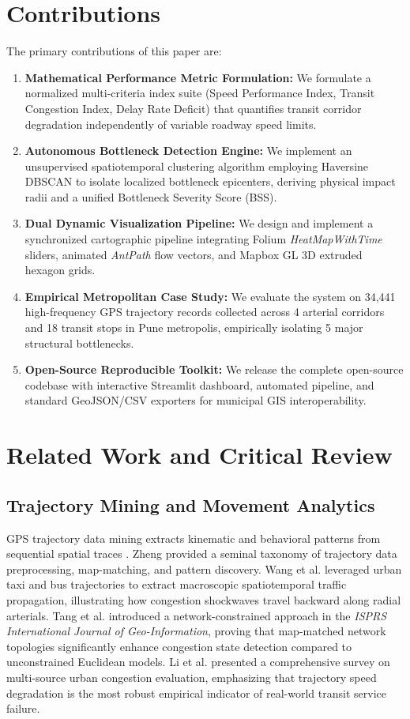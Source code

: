 \documentclass[conference]{IEEEtran}
\begin{document}
\section{Contributions}
The primary contributions of this paper are:
\begin{enumerate}
    \item \textbf{Mathematical Performance Metric Formulation:} We formulate a normalized multi-criteria index suite (Speed Performance Index, Transit Congestion Index, Delay Rate Deficit) that quantifies transit corridor degradation independently of variable roadway speed limits.
    \item \textbf{Autonomous Bottleneck Detection Engine:} We implement an unsupervised spatiotemporal clustering algorithm employing Haversine DBSCAN to isolate localized bottleneck epicenters, deriving physical impact radii and a unified Bottleneck Severity Score (BSS).
    \item \textbf{Dual Dynamic Visualization Pipeline:} We design and implement a synchronized cartographic pipeline integrating Folium \textit{HeatMapWithTime} sliders, animated \textit{AntPath} flow vectors, and Mapbox GL 3D extruded hexagon grids.
    \item \textbf{Empirical Metropolitan Case Study:} We evaluate the system on 34,441 high-frequency GPS trajectory records collected across 4 arterial corridors and 18 transit stops in Pune metropolis, empirically isolating 5 major structural bottlenecks.
    \item \textbf{Open-Source Reproducible Toolkit:} We release the complete open-source codebase with interactive Streamlit dashboard, automated pipeline, and standard GeoJSON/CSV exporters for municipal GIS interoperability.
\end{enumerate}

\section{Related Work and Critical Review}
\subsection{Trajectory Mining and Movement Analytics}
GPS trajectory data mining extracts kinematic and behavioral patterns from sequential spatial traces \cite{zheng2015trajectory}. Zheng provided a seminal taxonomy of trajectory data preprocessing, map-matching, and pattern discovery. Wang et al. \cite{wang2021spatiotemporal} leveraged urban taxi and bus trajectories to extract macroscopic spatiotemporal traffic propagation, illustrating how congestion shockwaves travel backward along radial arterials. Tang et al. \cite{tang2016network} introduced a network-constrained approach in the \textit{ISPRS International Journal of Geo-Information}, proving that map-matched network topologies significantly enhance congestion state detection compared to unconstrained Euclidean models. Li et al. \cite{li2018urban} presented a comprehensive survey on multi-source urban congestion evaluation, emphasizing that trajectory speed degradation is the most robust empirical indicator of real-world transit service failure.
\end{document}
